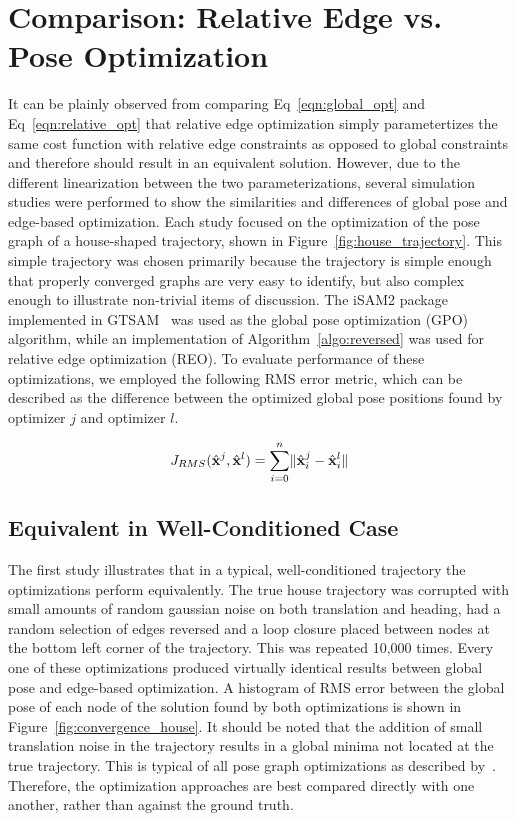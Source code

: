 
\section{Comparison: Relative Edge vs. Pose Optimization}

It can be plainly observed from comparing Eq~\ref{eqn:global_opt} and Eq~\ref{eqn:relative_opt} that relative edge optimization simply parametertizes the same cost function with relative edge constraints as opposed to global constraints and therefore should result in an equivalent solution.  However, due to the different linearization between the two parameterizations, several simulation studies were performed to show the similarities and differences of global pose and edge-based optimization. Each study focused on the optimization of the pose graph of a house-shaped trajectory, shown in Figure~\ref{fig:house_trajectory}.  This simple trajectory was chosen primarily because the trajectory is simple enough that properly converged graphs are very easy to identify, but also complex enough to illustrate non-trivial items of discussion.  The iSAM2 package~\cite{Kaess2012} implemented in GTSAM~\cite{Dellaert2012} was used as the global pose optimization (GPO) algorithm, while an implementation of Algorithm~\ref{algo:reversed} was used for relative edge optimization (REO).  To evaluate performance of these optimizations, we employed the following RMS error metric, which can be described as the difference between the optimized global pose positions found by optimizer $j$ and optimizer $l$.

\begin{align}
    J_{RMS}(\hat{\mathbf{x}}^j, \hat{\mathbf{x}}^l) = \sum_{i=0}^n \lVert \hat{\mathbf{x}}^j_i - \hat{\mathbf{x}}^l_i \rVert
    \label{eq:RMS_error}
\end{align}

\subsection{Equivalent in Well-Conditioned Case}

The first study illustrates that in a typical, well-conditioned trajectory the optimizations perform equivalently.  The true house trajectory was corrupted with small amounts of random gaussian noise on both translation and heading, had a random selection of edges reversed and a loop closure placed between nodes at the bottom left corner of the trajectory. This was repeated 10,000 times.  Every one of these optimizations produced virtually identical results between global pose and edge-based optimization.  A histogram of RMS error between the global pose of each node of the solution found by both optimizations is shown in Figure~\ref{fig:convergence_house}.  It should be noted that the addition of small translation noise in the trajectory results in a global minima not located at the true trajectory.  This is typical of all pose graph optimizations as described by~\cite{POSE_GRAPH_ERROR}.  Therefore, the optimization approaches are best compared directly with one another, rather than against the ground truth.

